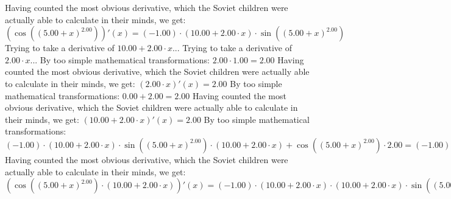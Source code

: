 \documentclass{article}
\begin{document}
Having counted the most obvious derivative, which the Soviet children were actually able to calculate in their minds, we get:
$( \cos {\left({\left({{5.00} + {x}}\right) ^ {2.00}}\right)} )'(x) = {\left({-1.00}\right) \cdot {\left({{10.00} + {{2.00} \cdot {x}}}\right) \cdot  \sin {\left({\left({{5.00} + {x}}\right) ^ {2.00}}\right)} }}$\newline
\newline
Trying to take a derivative of ${{10.00} + {{2.00} \cdot {x}}}$...\newline
\newline
Trying to take a derivative of ${{2.00} \cdot {x}}$...\newline
\newline
By too simple mathematical transformations:
 ${{2.00} \cdot {1.00}} = {2.00}$ 
 \newline
 \newline 
Having counted the most obvious derivative, which the Soviet children were actually able to calculate in their minds, we get:
$({{2.00} \cdot {x}})'(x) = {2.00}$\newline
\newline
By too simple mathematical transformations:
 ${{0.00} + {2.00}} = {2.00}$ 
 \newline
 \newline 
Having counted the most obvious derivative, which the Soviet children were actually able to calculate in their minds, we get:
$({{10.00} + {{2.00} \cdot {x}}})'(x) = {2.00}$\newline
\newline
By too simple mathematical transformations:
 ${{{\left({-1.00}\right) \cdot {\left({{10.00} + {{2.00} \cdot {x}}}\right) \cdot  \sin {\left({\left({{5.00} + {x}}\right) ^ {2.00}}\right)} }} \cdot \left({{10.00} + {{2.00} \cdot {x}}}\right)} + { \cos {\left({\left({{5.00} + {x}}\right) ^ {2.00}}\right)}  \cdot {2.00}}} = {{\left({-1.00}\right) \cdot {\left({{10.00} + {{2.00} \cdot {x}}}\right) \cdot {\left({{10.00} + {{2.00} \cdot {x}}}\right) \cdot  \sin {\left({\left({{5.00} + {x}}\right) ^ {2.00}}\right)} }}} + {{2.00} \cdot  \cos {\left({\left({{5.00} + {x}}\right) ^ {2.00}}\right)} }}$ 
 \newline
 \newline 
Having counted the most obvious derivative, which the Soviet children were actually able to calculate in their minds, we get:
$({ \cos {\left({\left({{5.00} + {x}}\right) ^ {2.00}}\right)}  \cdot \left({{10.00} + {{2.00} \cdot {x}}}\right)})'(x) = {{\left({-1.00}\right) \cdot {\left({{10.00} + {{2.00} \cdot {x}}}\right) \cdot {\left({{10.00} + {{2.00} \cdot {x}}}\right) \cdot  \sin {\left({\left({{5.00} + {x}}\right) ^ {2.00}}\right)} }}} + {{2.00} \cdot  \cos {\left({\left({{5.00} + {x}}\right) ^ {2.00}}\right)} }}$\newline
\end{document}
